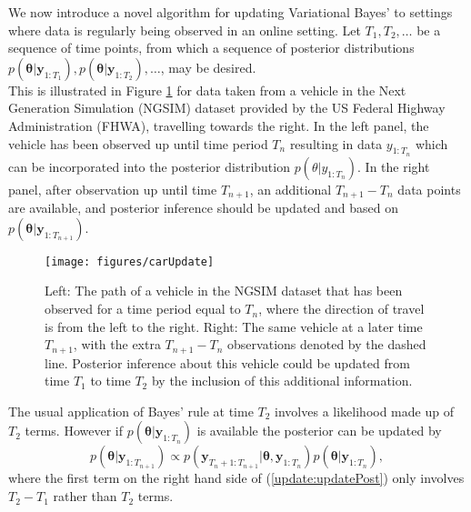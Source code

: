 \documentclass[12pt,a4paper]{article}\usepackage[]{graphicx}\usepackage[]{color}
\begin{document}
{\color{blue} We now introduce a novel algorithm for updating Variational Bayes' to settings where data is regularly being observed in an online setting.  Let $T_1, T_2, \ldots$ be a sequence of time points, from which a sequence of posterior distributions $p({\bm\theta} | {\bm y}_{1:T_1}), p({\bm\theta} | {\bm y}_{1:T_2}), \ldots$, may be desired.
\\

This is illustrated in Figure \ref{fig:updatetimeUpdate} for data taken from a vehicle in the Next Generation Simulation (NGSIM) dataset provided by the US Federal Highway Administration (FHWA), travelling towards the right. In the left panel, the vehicle has been observed up until time period $T_{n}$ resulting in data $y_{1:T_{n}}$ which can be incorporated into the posterior distribution $p(\theta | y_{1:T_{n}})$. In the right panel, after observation up until time $T_{n+1}$, an additional $T_{n+1} - T_{n}$ data points are available, and posterior inference should be updated and based on $p({\bm\theta} | {\bm y}_{1:T_{n+1}})$.

\begin{figure}[htbp]
\centering
\texttt{[image: figures/carUpdate]}
\caption{Left: The path of a vehicle in the NGSIM dataset that has been observed for a time period equal to $T_{n}$, where the direction of travel is from the left to the right. Right: The same vehicle at a later time $T_{n+1}$, with the extra $T_{n+1} - T_{n}$ observations denoted by the dashed line. Posterior inference about this vehicle could be updated from time $T_{1}$ to time $T_{2}$ by the inclusion of this additional information.}
\label{fig:updatetimeUpdate}
\end{figure}
The usual application of Bayes' rule at time $T_2$ involves a likelihood made up of $T_2$ terms.  However if $p({\bm\theta} | {\bm y}_{1:T_{n}})$ is available the posterior can be updated by 
\begin{equation}
\label{update:updatePost}
p({\bm\theta} | {\bm y}_{1:T_{n+1}}) \propto p({\bm y}_{T_{n}+1:T_{n+1}} | {\bm\theta}, {\bm y}_{1:T_{n}})p({\bm\theta} | {\bm y}_{1:T_{n}}),
\end{equation}
where the first term on the right hand side of (\ref{update:updatePost}) only involves $T_2-T_1$ rather than $T_2$ terms.

}
\end{document}
